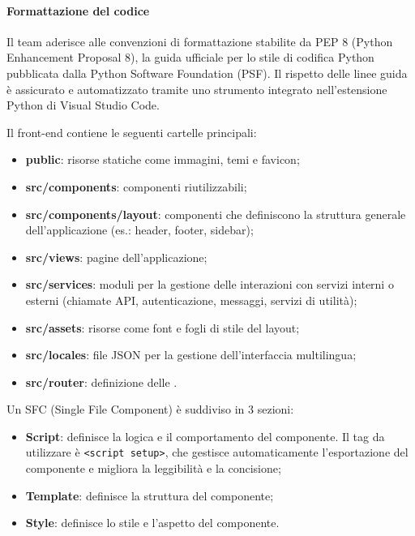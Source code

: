 \paragraph*{Formattazione del codice}
\par Il team aderisce alle convenzioni di formattazione stabilite da PEP 8 (Python Enhancement Proposal 8), la guida ufficiale per lo stile di codifica Python pubblicata dalla Python Software Foundation (PSF). Il rispetto delle linee guida è assicurato e automatizzato tramite uno strumento integrato nell'estensione Python di Visual Studio Code.

\par Il front-end contiene le seguenti cartelle principali:
\begin{itemize}
  \item \textbf{public}: risorse statiche come immagini, temi e favicon;
  \item \textbf{src/components}: componenti riutilizzabili;
  \item \textbf{src/components/layout}: componenti che definiscono la struttura generale dell'applicazione (es.: header, footer, sidebar);
  \item \textbf{src/views}: pagine dell'applicazione;
  \item \textbf{src/services}: moduli per la gestione delle interazioni con servizi interni o esterni (chiamate API, autenticazione, messaggi, servizi di utilità);
  \item \textbf{src/assets}: risorse come font e fogli di stile del layout;
  \item \textbf{src/locales}: file JSON per la gestione dell'interfaccia multilingua;
  \item \textbf{src/router}: definizione delle .
\end{itemize}

\par Un SFC (Single File Component) è suddiviso in 3 sezioni:
\begin{itemize}
  \item \textbf{Script}: definisce la logica e il comportamento del componente. Il tag da utilizzare è \verb|<script setup>|, che gestisce automaticamente l'esportazione del componente e migliora la leggibilità e la concisione;
  \item \textbf{Template}: definisce la struttura del componente;
  \item \textbf{Style}: definisce lo stile e l'aspetto del componente.
\end{itemize}

